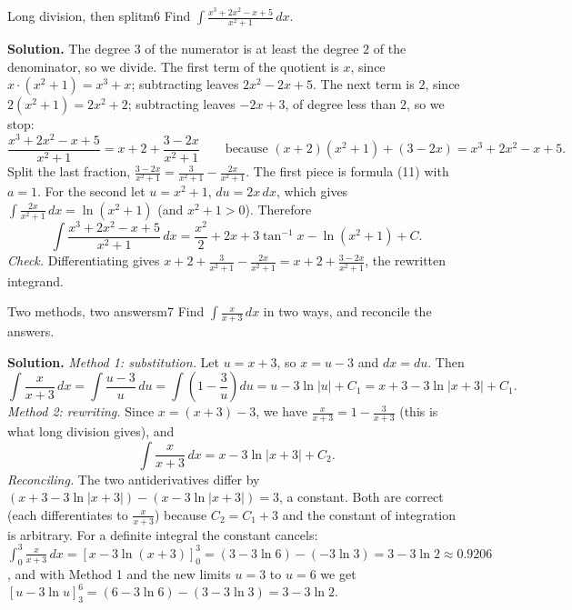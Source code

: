 \documentclass[11pt]{article}
\begin{document}
\begin{exmp}{Long division, then split}{m6}
Find $\int\frac{x^3+2x^2-x+5}{x^2+1}\,dx$.

\textbf{Solution.} The degree $3$ of the numerator is at least the degree $2$ of the denominator, so we divide. The first term of the quotient is $x$, since $x\cdot(x^2+1)=x^3+x$; subtracting leaves $2x^2-2x+5$. The next term is $2$, since $2(x^2+1)=2x^2+2$; subtracting leaves $-2x+3$, of degree less than $2$, so we stop:
\[\frac{x^3+2x^2-x+5}{x^2+1}=x+2+\frac{3-2x}{x^2+1}\qquad\text{because }(x+2)(x^2+1)+(3-2x)=x^3+2x^2-x+5 .\]
Split the last fraction, $\frac{3-2x}{x^2+1}=\frac3{x^2+1}-\frac{2x}{x^2+1}$. The first piece is formula (11) with $a=1$. For the second let $u=x^2+1$, $du=2x\,dx$, which gives $\int\frac{2x}{x^2+1}\,dx=\ln(x^2+1)$ (and $x^2+1>0$). Therefore
\[\int\frac{x^3+2x^2-x+5}{x^2+1}\,dx=\frac{x^2}2+2x+3\tan^{-1}x-\ln(x^2+1)+C .\]
\emph{Check.} Differentiating gives $x+2+\frac3{x^2+1}-\frac{2x}{x^2+1}=x+2+\frac{3-2x}{x^2+1}$, the rewritten integrand.
\end{exmp}

\begin{exmp}{Two methods, two answers}{m7}
Find $\int\frac{x}{x+3}\,dx$ in two ways, and reconcile the answers.

\textbf{Solution.} \emph{Method 1: substitution.} Let $u=x+3$, so $x=u-3$ and $dx=du$. Then
\[\int\frac{x}{x+3}\,dx=\int\frac{u-3}u\,du=\int\left(1-\frac3u\right)du=u-3\ln\lvert u\rvert+C_1=x+3-3\ln\lvert x+3\rvert+C_1 .\]
\emph{Method 2: rewriting.} Since $x=(x+3)-3$, we have $\frac x{x+3}=1-\frac3{x+3}$ (this is what long division gives), and
\[\int\frac{x}{x+3}\,dx=x-3\ln\lvert x+3\rvert+C_2 .\]
\emph{Reconciling.} The two antiderivatives differ by $(x+3-3\ln\lvert x+3\rvert)-(x-3\ln\lvert x+3\rvert)=3$, a constant. Both are correct (each differentiates to $\frac x{x+3}$) because $C_2=C_1+3$ and the constant of integration is arbitrary. For a definite integral the constant cancels: $\int_0^3\frac{x}{x+3}\,dx=\left[x-3\ln(x+3)\right]_0^3=(3-3\ln6)-(-3\ln3)=3-3\ln2\approx0.9206$, and with Method 1 and the new limits $u=3$ to $u=6$ we get $\left[u-3\ln u\right]_3^6=(6-3\ln6)-(3-3\ln3)=3-3\ln2$.
\end{exmp}
\end{document}

